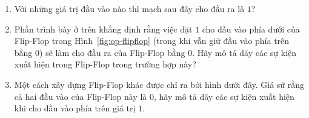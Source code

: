 \begin{enumerate}
 \item Với những giá trị đầu vào nào thì mạch sau đây cho đầu ra là $1$?
    \begin{center}
    \end{center}

 \item Phần trình bày ở trên khẳng định rằng việc đặt $1$ cho đầu vào
   phía dưới của Flip-Flop trong Hình~\ref{fig:op-flipflop} (trong khi
   vẫn giữ đầu vào phía trên bằng $0$) sẽ làm cho đầu ra của Flip-Flop
   bằng $0$. Hãy mô tả dãy các sự kiện xuất hiện trong Flip-Flop trong
   trường hợp này?

  \item Một cách xây dựng Flip-Flop khác được chỉ ra bởi hình dưới đây. Giả sử rằng cả hai
    đầu vào của Flip-Flop này là $0$, hãy mô tả dãy các sự kiện xuất hiện khi cho đầu vào
    phía trên giá trị $1$.
   \begin{center}
   \end{center}



\end{enumerate}
